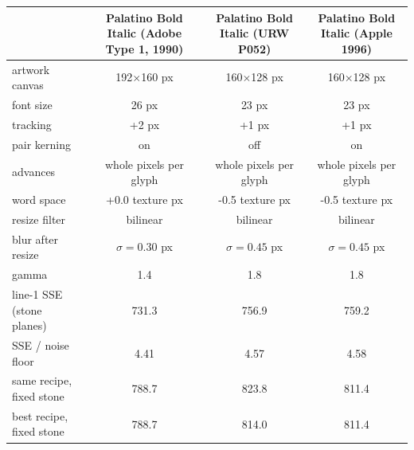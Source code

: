\begin{tabular}{lccc}\toprule
 & Palatino Bold Italic (Adobe Type 1, 1990) & Palatino Bold Italic (URW P052) & Palatino Bold Italic (Apple 1996) \\ \midrule
artwork canvas & 192$\times$160 px & 160$\times$128 px & 160$\times$128 px \\
font size & 26 px & 23 px & 23 px \\
tracking & +2 px & +1 px & +1 px \\
pair kerning & on & off & on \\
advances & whole pixels per glyph & whole pixels per glyph & whole pixels per glyph \\
word space & +0.0 texture px & -0.5 texture px & -0.5 texture px \\
resize filter & bilinear & bilinear & bilinear \\
blur after resize & $\sigma=0.30$ px & $\sigma=0.45$ px & $\sigma=0.45$ px \\
gamma & 1.4 & 1.8 & 1.8 \\
line-1 SSE (stone planes) & 731.3 & 756.9 & 759.2 \\
SSE / noise floor & 4.41 & 4.57 & 4.58 \\
same recipe, fixed stone & 788.7 & 823.8 & 811.4 \\
best recipe, fixed stone & 788.7 & 814.0 & 811.4 \\
\bottomrule\end{tabular}
